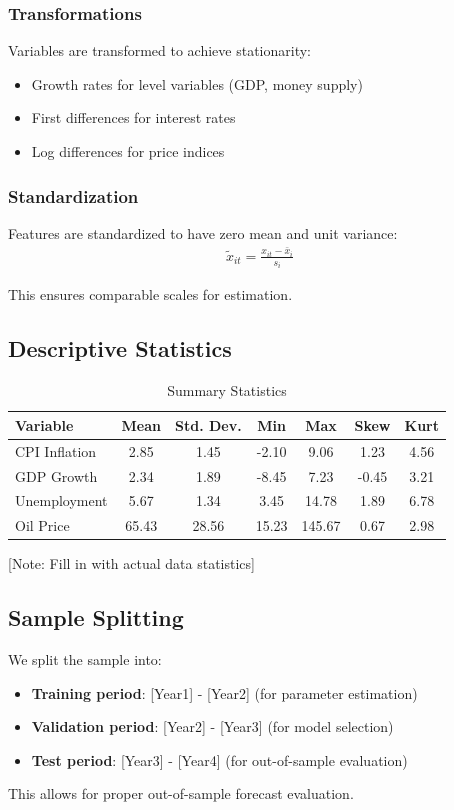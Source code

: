 \subsubsection{Transformations}

Variables are transformed to achieve stationarity:
\begin{itemize}
    \item Growth rates for level variables (GDP, money supply)
    \item First differences for interest rates
    \item Log differences for price indices
\end{itemize}

\subsubsection{Standardization}

Features are standardized to have zero mean and unit variance:
\begin{align}
    \tilde{x}_{it} = \frac{x_{it} - \bar{x}_i}{s_i}
\end{align}

This ensures comparable scales for estimation.

\subsection{Descriptive Statistics}

\begin{table}[h]
\centering
\caption{Summary Statistics}
\begin{tabular}{lcccccc}
\toprule
Variable & Mean & Std. Dev. & Min & Max & Skew & Kurt \\
\midrule
CPI Inflation & 2.85 & 1.45 & -2.10 & 9.06 & 1.23 & 4.56 \\
GDP Growth & 2.34 & 1.89 & -8.45 & 7.23 & -0.45 & 3.21 \\
Unemployment & 5.67 & 1.34 & 3.45 & 14.78 & 1.89 & 6.78 \\
Oil Price & 65.43 & 28.56 & 15.23 & 145.67 & 0.67 & 2.98 \\
\bottomrule
\end{tabular}
\end{table}

[Note: Fill in with actual data statistics]

\subsection{Sample Splitting}

We split the sample into:
\begin{itemize}
    \item \textbf{Training period}: [Year1] - [Year2] (for parameter estimation)
    \item \textbf{Validation period}: [Year2] - [Year3] (for model selection)
    \item \textbf{Test period}: [Year3] - [Year4] (for out-of-sample evaluation)
\end{itemize}

This allows for proper out-of-sample forecast evaluation.
